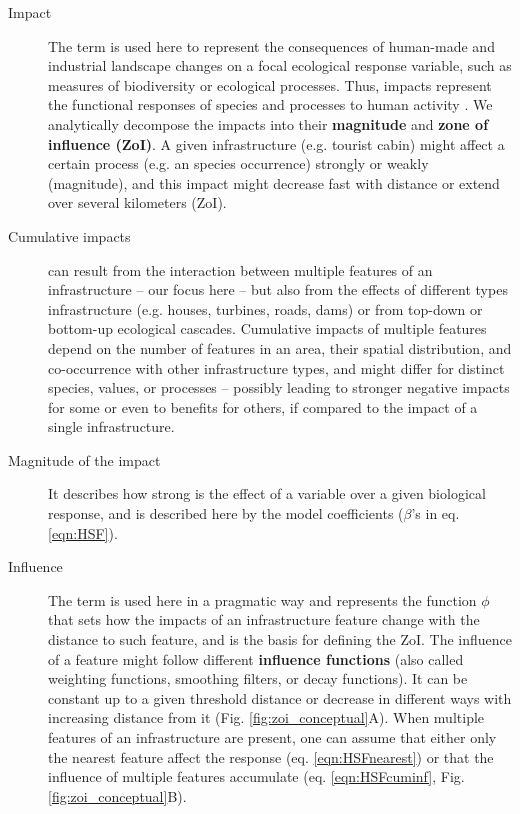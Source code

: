 \documentclass[titlepage]{article}
\begin{document}
\begin{tcolorbox}[width=1.3\textwidth,center,colback=yellow!5,colframe=yellow!75!black,title={Box 1 -- Definitions}]

\begin{description}

    \item[Impact] The term is used here to represent the consequences of human-made and industrial landscape changes on a focal ecological response variable, such as measures of biodiversity or ecological processes. Thus, impacts represent the functional responses of species and processes to human activity \citep{naugle_unifying_2011}. We analytically decompose the impacts into their \textbf{magnitude} and \textbf{zone of influence (ZoI)}. A given infrastructure (e.g. tourist cabin) might affect a certain process (e.g. an species occurrence) strongly or weakly (magnitude), and this impact might decrease fast with distance or extend over several kilometers (ZoI).
    
    \item[Cumulative impacts] can result from the interaction between multiple features of an infrastructure -- our focus here -- but also from the effects of different types infrastructure (e.g. houses, turbines, roads, dams) or from top-down or bottom-up ecological cascades. Cumulative impacts of multiple features depend on the number of features in an area, their spatial distribution, and co-occurrence with other infrastructure types, and might differ for distinct species, values, or processes -- possibly leading to stronger negative impacts for some or even to benefits for others, if compared to the impact of a single infrastructure.
    
    \item[Magnitude of the impact] It describes how strong is the effect of a variable over a given biological response, and is described here by the model coefficients ($\beta$'s in eq. \ref{eqn:HSF}). 
    
    \item[Influence] The term is used here in a pragmatic way and represents the function $\phi$ that sets how the impacts of an infrastructure feature change with the distance to such feature, and is the basis for defining the ZoI. The influence of a feature might follow different \textbf{influence functions} (also called weighting functions, smoothing filters, or decay functions). It can be constant up to a given threshold distance or decrease in different ways with increasing distance from it (Fig. \ref{fig:zoi_conceptual}A). When multiple features of an infrastructure are present, one can assume that either only the nearest feature affect the response (eq. \ref{eqn:HSFnearest}) or that the influence of multiple features accumulate (eq. \ref{eqn:HSFcuminf}, Fig. \ref{fig:zoi_conceptual}B).
    

\end{description}
\end{tcolorbox}
\end{document}
